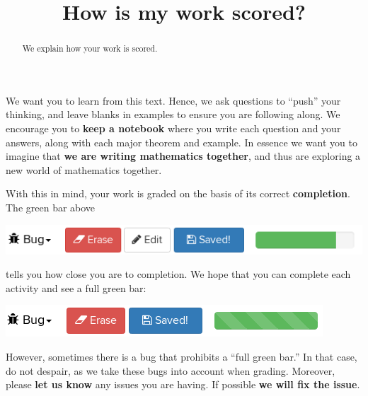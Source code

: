\documentclass{ximera}
\title{How is my work scored?}
\begin{document}
\begin{abstract}
  We explain how your work is scored.
\end{abstract}
\maketitle

We want you to learn from this text. Hence, we ask questions to
``push'' your thinking, and leave blanks in examples to ensure you are
following along. We encourage you to \textbf{keep a notebook} where
you write each question and your answers, along with each major
theorem and example. In essence we want you to imagine that \textbf{we
  are writing mathematics together}, and thus are exploring a new
world of mathematics together.

With this in mind, your work is graded on the basis of its correct
\textbf{completion}. The green bar above
\begin{image}
  \includegraphics{partialBar.png}
\end{image}
tells you how close you are to completion. We hope that you can
complete each activity and see a full green bar:
\begin{image}
  \includegraphics{fullGreen.png}
\end{image}
However, sometimes there is a bug that prohibits a ``full green bar.''
In that case, do not despair, as we take these bugs into account when
grading. Moreover, please \textbf{let us know} any issues you are
having. If possible \textbf{we will fix the issue}.
\end{document}
